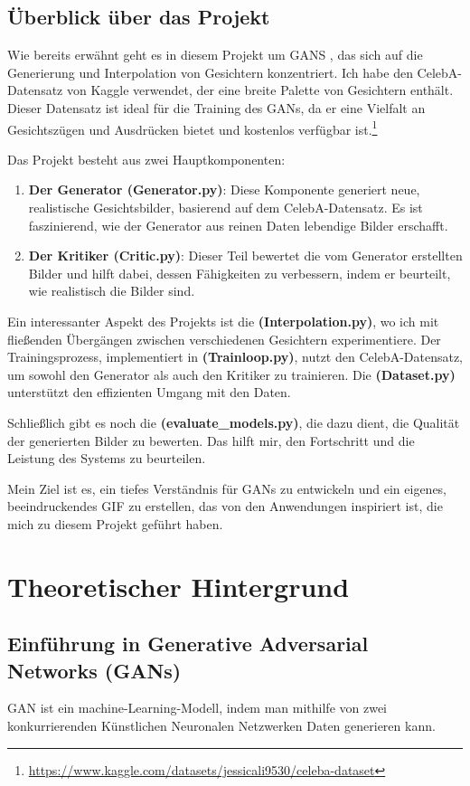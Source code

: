 \documentclass[a4paper, 12pt]{article}
\begin{document}
\subsection{Überblick über das Projekt}
Wie bereits erwähnt geht es in diesem Projekt  um GANS , das sich auf die Generierung und Interpolation von Gesichtern konzentriert. Ich habe den CelebA-Datensatz von Kaggle verwendet, der eine breite Palette von Gesichtern enthält. Dieser Datensatz ist ideal für die Training des GANs, da er eine Vielfalt an Gesichtszügen und Ausdrücken bietet und kostenlos verfügbar ist.\footnote{\url{https://www.kaggle.com/datasets/jessicali9530/celeba-dataset}}

Das Projekt besteht aus zwei Hauptkomponenten:
\begin{enumerate}
  \item \textbf{Der Generator (Generator.py)}: Diese Komponente generiert neue, realistische Gesichtsbilder, basierend auf dem CelebA-Datensatz. Es ist faszinierend, wie der Generator aus reinen Daten lebendige Bilder erschafft.
  \item \textbf{Der Kritiker (Critic.py)}: Dieser Teil bewertet die vom Generator erstellten Bilder und hilft dabei, dessen Fähigkeiten zu verbessern, indem er beurteilt, wie realistisch die Bilder sind.
\end{enumerate}

Ein interessanter Aspekt des Projekts ist die \textbf{(Interpolation.py)}, wo ich mit fließenden Übergängen zwischen verschiedenen Gesichtern experimentiere. Der Trainingsprozess, implementiert in \textbf{(Trainloop.py)}, nutzt den CelebA-Datensatz, um sowohl den Generator als auch den Kritiker zu trainieren. Die \textbf{(Dataset.py)} unterstützt den effizienten Umgang mit den Daten.

Schließlich gibt es noch die \textbf{(evaluate\_models.py)}, die dazu dient, die Qualität der generierten Bilder zu bewerten. Das hilft mir, den Fortschritt und die Leistung des Systems zu beurteilen.

Mein Ziel ist es, ein tiefes Verständnis für GANs zu entwickeln und ein eigenes, beeindruckendes GIF zu erstellen, das von den Anwendungen inspiriert ist, die mich zu diesem Projekt geführt haben.



\section{Theoretischer Hintergrund}
\subsection{Einführung in Generative Adversarial Networks (GANs)}
GAN ist ein machine-Learning-Modell, indem man mithilfe von zwei konkurrierenden Künstlichen Neuronalen Netzwerken Daten generieren kann. \cite{youtube_gans}
\end{document}

